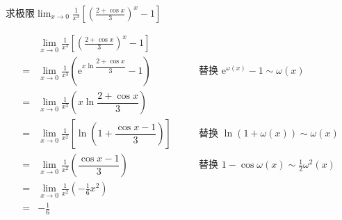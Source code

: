 \begin{example}
    求极限$\lim_{x\to 0}\frac{1}{x^3}\left[ \left( \frac{2+\cos x}{3} \right)^x -1 \right] $
\end{example}
\begin{solution}
    \begin{align*}
          & \lim_{x\to 0}\frac{1}{x^3}\left[ \left( \frac{2+\cos x}{3} \right)^x -1 \right]    &                                                                 \\
        = & \lim_{x\to 0} \frac{1}{x^3}\left( \mathrm{e}^{x\ln\dfrac{2+\cos x}{3}} - 1 \right) & \qquad\text{替换~} \mathrm{e}^{\omega(x)}-1 \sim \omega(x)      \\
        = & \lim_{x\to 0} \frac{1}{x^3}\left( x\ln\dfrac{2+\cos x}{3} \right)                  &                                                                 \\
        = & \lim_{x\to 0} \frac{1}{x^2}\left[ \ln(1 + \dfrac{\cos x -1}{3})\right]             & \qquad\text{替换~} \ln(1+\omega(x)) \sim \omega(x)              \\
        = & \lim_{x\to 0} \frac{1}{x^2}\left( \dfrac{\cos x -1}{3} \right )                    & \qquad\text{替换~} 1-\cos \omega(x) \sim \frac{1}{2}\omega^2(x) \\
        = & \lim_{x\to 0} \frac{1}{x^2}\left( -\frac{1}{6}x^2 \right)                          &                                                                 \\
        = & -\frac{1}{6}
    \end{align*}
\end{solution}

